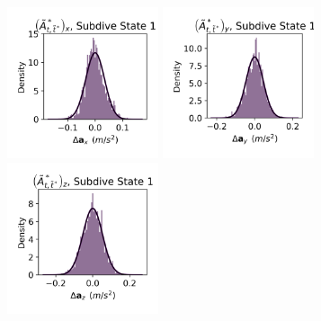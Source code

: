 \documentclass{article}
\begin{document}
        \begin{center}
        \includegraphics[width=1.75in]{../Plots/CarHMM_empirical_hist_Ax_0.png}
        \includegraphics[width=1.75in]{../Plots/CarHMM_empirical_hist_Ay_0.png}
        \includegraphics[width=1.75in]{../Plots/CarHMM_empirical_hist_Az_0.png}
        

\end{center}
\end{document}
